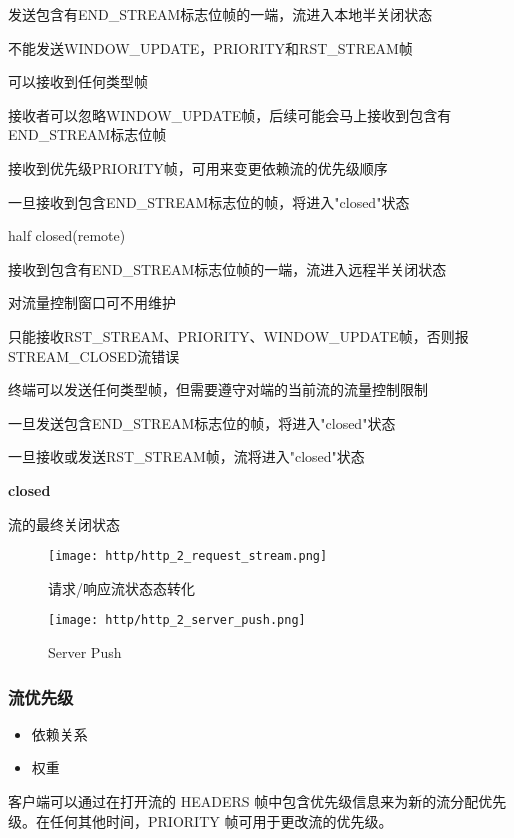  发送包含有END\_STREAM标志位帧的一端，流进入本地半关闭状态

 \qquad 不能发送WINDOW\_UPDATE，PRIORITY和RST\_STREAM帧

 \qquad 可以接收到任何类型帧

 \qquad 接收者可以忽略WINDOW\_UPDATE帧，后续可能会马上接收到包含有END\_STREAM标志位帧

 \qquad 接收到优先级PRIORITY帧，可用来变更依赖流的优先级顺序

 \qquad 一旦接收到包含END\_STREAM标志位的帧，将进入"closed"状态

 half closed(remote)
 
接收到包含有END\_STREAM标志位帧的一端，流进入远程半关闭状态
 
    \qquad 对流量控制窗口可不用维护

    \qquad 只能接收RST\_STREAM、PRIORITY、WINDOW\_UPDATE帧，否则报STREAM\_CLOSED流错误

    \qquad 终端可以发送任何类型帧，但需要遵守对端的当前流的流量控制限制

    \qquad 一旦发送包含END\_STREAM标志位的帧，将进入"closed"状态

一旦接收或发送RST\_STREAM帧，流将进入"closed"状态

\textbf{closed}

流的最终关闭状态



\begin{figure}[H]
    \centering
    \texttt{[image: http/http\_2\_request\_stream.png]}
    \caption{请求/响应流状态态转化}
\end{figure}

\begin{figure}[H]
    \centering
    \texttt{[image: http/http\_2\_server\_push.png]}
    \caption{Server Push}
\end{figure}


\subsubsection{流优先级}

\begin{itemize}
    \item 依赖关系
    \item 权重
\end{itemize} 


客户端可以通过在打开流的 HEADERS 帧中包含优先级信息来为新的流分配优先级。在任何其他时间，PRIORITY 帧可用于更改流的优先级。

